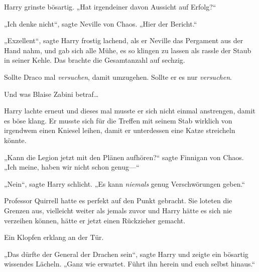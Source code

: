 Harry grinste bösartig. „Hat irgendeiner davon Aussicht auf Erfolg?“

„Ich denke nicht“, sagte Neville von Chaos. „Hier der Bericht.“

„Exzellent“, sagte Harry frostig lachend, als er Neville das Pergament aus der Hand nahm, und gab sich alle Mühe, es so klingen zu lassen als rassle der Staub in seiner Kehle. Das brachte die Gesamtanzahl auf sechzig.

Sollte Draco mal \emph{versuchen}, damit umzugehen. Sollte er es nur \emph{versuchen}.

Und was Blaise Zabini betraf…

Harry lachte erneut und dieses mal musste er sich nicht einmal anstrengen, damit es böse klang. Er musste sich für die Treffen mit seinem Stab wirklich von irgendwem einen Kniesel leihen, damit er unterdessen eine Katze streicheln könnte.

„Kann die Legion jetzt mit den Plänen aufhören?“ sagte Finnigan von Chaos. „Ich meine, haben wir nicht schon genug—“

„Nein“, sagte Harry schlicht. „Es kann \emph{niemals} genug Verschwörungen geben.“

Professor Quirrell hatte es perfekt auf den Punkt gebracht. Sie loteten die Grenzen aus, vielleicht weiter als jemals zuvor und Harry hätte es sich nie verzeihen können, hätte er jetzt einen Rückzieher gemacht.

Ein Klopfen erklang an der Tür.

„Das dürfte der General der Drachen sein“, sagte Harry und zeigte ein bösartig wissendes Lächeln. „Ganz wie erwartet. Führt ihn herein und euch selbst hinaus.“


